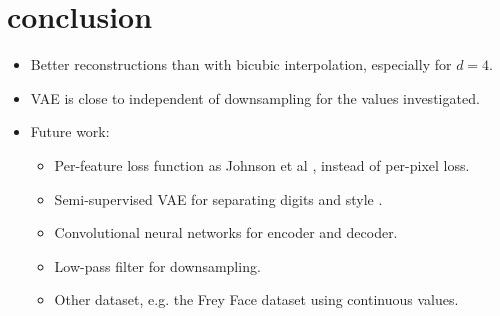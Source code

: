 \section{conclusion}
\label{sec:conclusion}

\begin{itemize}
	\item Better reconstructions than with bicubic interpolation, especially for $d = 4$.
	\item VAE is close to independent of downsampling for the values investigated.
	\item Future work:
	\begin{itemize}
		\item Per-feature loss function as Johnson et al \cite{Johnson16}, instead of per-pixel loss.
		\item Semi-supervised VAE for separating digits and style \cite{Kingma2014}.
		\item Convolutional neural networks for encoder and decoder.
		\item Low-pass filter for downsampling.
		\item Other dataset, e.g. the Frey Face dataset \cite{Frey} using continuous values. 
	\end{itemize}
\end{itemize}
